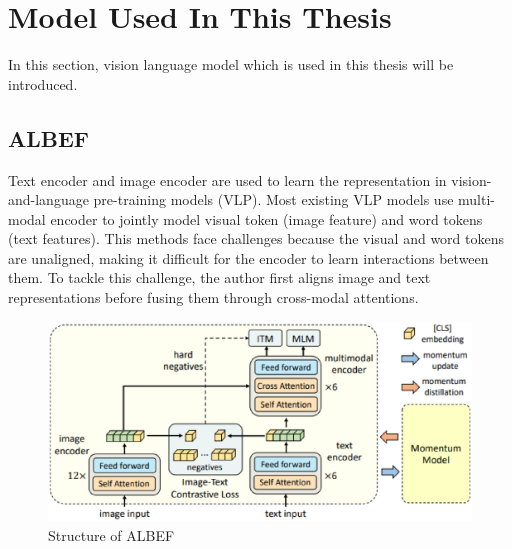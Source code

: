 
\section{Model Used In This Thesis}
In this section, vision language model which is used in this thesis will be introduced.

\subsection{ALBEF}
Text encoder and image encoder are used to learn the representation in vision-and-language pre-training models (VLP). Most existing VLP models use multi-modal encoder to jointly model visual token (image feature) and word tokens (text features). This methods face challenges because the visual and word tokens are unaligned, making it difficult for the encoder to learn interactions between them. 
To tackle this challenge, the author first aligns image and text representations before fusing them through cross-modal attentions. 

\begin{figure}[htbp]
    \begin{center}
        \includegraphics[width=\linewidth]{img/albef_model_structure.eps}
        \caption{Structure of ALBEF}
        \label{fig:albef}
    \end{center}
\end{figure}

